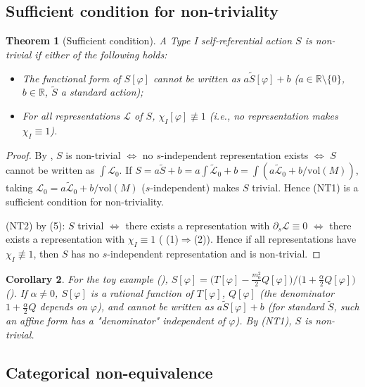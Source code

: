 \documentclass[12pt,letterpaper]{article}
\newtheorem{theorem}{Theorem}[section]
\newtheorem{corollary}[theorem]{Corollary}
\theoremstyle{definition}
\newcommand{\mL}{\mathcal{L}}
\newcommand{\vol}{\mathrm{vol}}
\newcommand{\R}{\mathbb{R}}
\newcommand{\chiI}{\chi_I}
\begin{document}
\subsection{Sufficient condition for non-triviality}

\begin{theorem}[Sufficient condition]
\label{thm:p13}
A Type I self-referential action $S$ is non-trivial if either of the following holds:
\begin{itemize}
\item[(NT1)] The functional form of $S[\varphi]$ cannot be written as $a \tilde{S}[\varphi] + b$ ($a \in \R \setminus\{0\}$, $b \in \R$, $\tilde{S}$ a standard action);
\item[(NT2)] For \emph{all} representations $\mL$ of $S$, $\chiI[\varphi] \not\equiv 1$ (i.e., no representation makes $\chiI \equiv 1$).
\end{itemize}
\end{theorem}

\begin{proof}
By , $S$ is non-trivial $\iff$ no $s$-independent representation exists $\iff$ $S$ cannot be written as $\int \mL_0$. If $S = a\tilde{S} + b = a\int\tilde{\mL}_0 + b = \int(a\tilde{\mL}_0 + b/\vol(M))$, taking $\mL_0 = a\tilde{\mL}_0 + b/\vol(M)$ ($s$-independent) makes $S$ trivial. Hence (NT1) is a sufficient condition for non-triviality.

(NT2) by  (5): $S$ trivial $\iff$ there exists a representation with $\partial_s \mL \equiv 0$ $\iff$ there exists a representation with $\chiI \equiv 1$ ( (1)$\Rightarrow$(2)). Hence if all representations have $\chiI \not\equiv 1$, then $S$ has no $s$-independent representation and is non-trivial.
\end{proof}

\begin{corollary}
\label{cor:nontriv}
For the toy example (), $S[\varphi] = \bigl(T[\varphi] - \frac{m_0^2}{2}Q[\varphi]\bigr)/\bigl(1 + \frac{\alpha}{2}Q[\varphi]\bigr)$ (). If $\alpha \neq 0$, $S[\varphi]$ is a rational function of $T[\varphi]$, $Q[\varphi]$ (the denominator $1 + \frac{\alpha}{2}Q$ depends on $\varphi$), and cannot be written as $a\tilde{S}[\varphi] + b$ (for standard $\tilde{S}$, such an affine form has a "denominator" independent of $\varphi$). By  (NT1), $S$ is non-trivial.
\end{corollary}

\subsection{Categorical non-equivalence}
\label{sec:cat}
\end{document}
